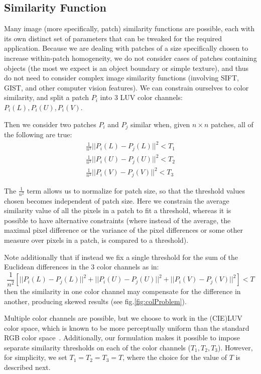 \subsection{Similarity Function}
\label{sec:simthresh}

Many image (more specifically, patch) similarity functions are possible, each with its own distinct set of parameters that can be tweaked for the required application. Because we are dealing with patches of a size specifically chosen to increase within-patch homogeneity, we do not consider cases of patches containing objects (the most we expect is an object boundary or simple texture), and thus do not need to consider complex image similarity functions (involving SIFT, GIST, and other computer vision features). We can constrain ourselves to color similarity, and split a patch $P_i$ into 3 LUV color channels: $P_i(L), P_i(U), P_i(V)$. 

Then we consider two patches $P_i$ and $P_j$ similar when, given $n\times n$ patches, all of the following are true:
\begin{align*}
\frac{1}{n^2}||P_i(L) - P_j(L)||^2 < T_1 \\
\frac{1}{n^2}||P_i(U) - P_j(U)||^2 < T_2 \\
\frac{1}{n^2}||P_i(V) - P_j(V)||^2 < T_3
\end{align*}

The $\frac{1}{n^2}$ term allows us to normalize for patch size, so that the threshold values chosen becomes independent of patch size. Here we constrain the average similarity value of all the pixels in a patch to fit a threshold, whereas it is possible to have alternative constraints (where instead of the average, the maximal pixel difference or the variance of the pixel differences or some other measure over pixels in a patch, is compared to a threshold).

Note additionally that if instead we fix a single threshold for the sum of the Euclidean differences in the 3 color channels as in: 
\begin{displaymath}
\frac{1}{n^2}[||P_i(L) - P_j(L)||^2 + ||P_i(U) - P_j(U)||^2 + ||P_i(V) - P_j(V)||^2] < T
\end{displaymath}
then the similarity in one color channel may compensate for the difference in another, producing skewed results (see fig.\ref{fig:colProblem}).

Multiple color channels are possible, but we choose to work in the (CIE)LUV color space, which is known to be more perceptually uniform than the standard RGB color space~\cite{kekre2012performance}. Additionally, our formulation makes it possible to impose separate similarity thresholds on each of the color channels ($T_1,T_2,T_3$). However, for simplicity, we set $T_1=T_2=T_3=T$, where the choice for the value of $T$ is described next.

